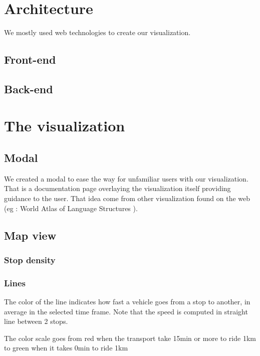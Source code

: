 \documentclass[12pt]{article}%
\begin{document}
\section{Architecture}
We mostly used web technologies to create our visualization.

\subsection{Front-end}

\subsection{Back-end}
 
\section{The visualization}

\subsection{Modal}

We created a modal to ease the way for unfamiliar users with our visualization. That is a documentation page overlaying the visualization itself providing guidance to the user. That idea come from other visualization found on the web (eg : World Atlas of Language Structures \cite{visuawithmodal}).


\subsection{Map view}

\subsubsection{Stop density}

\subsubsection{Lines}
The color of the line indicates how fast a vehicle goes from a stop to another, in average in the selected time frame. Note that the speed is computed in straight line between 2 stops.

The color scale goes from red when the transport take 15min or more to ride 1km to green when it takes 0min to ride 1km
\end{document}
